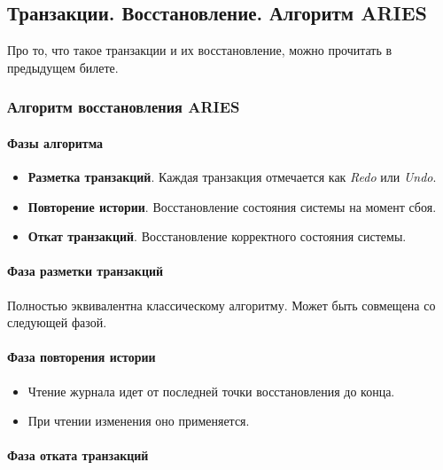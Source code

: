 \subsection{Транзакции. Восстановление. Алгоритм ARIES}

Про то, что такое транзакции и их восстановление, можно прочитать в предыдущем билете.

\subsubsection{Алгоритм восстановления ARIES}

\paragraph{Фазы алгоритма}

\begin{itemize}
    \item \textbf{Разметка транзакций}. Каждая транзакция отмечается как
        \textit{Redo} или \textit{Undo}.
    \item \textbf{Повторение истории}. Восстановление состояния системы на момент сбоя.
    \item \textbf{Откат транзакций}. Восстановление корректного состояния системы.
\end{itemize}

\paragraph{Фаза разметки транзакций}

Полностью эквивалентна классическому алгоритму. Может быть совмещена со следующей фазой.

\paragraph{Фаза повторения истории}

\begin{itemize}
    \item Чтение журнала идет от последней точки восстановления до конца.
    \item При чтении изменения оно применяется.
\end{itemize}

\paragraph{Фаза отката транзакций}

